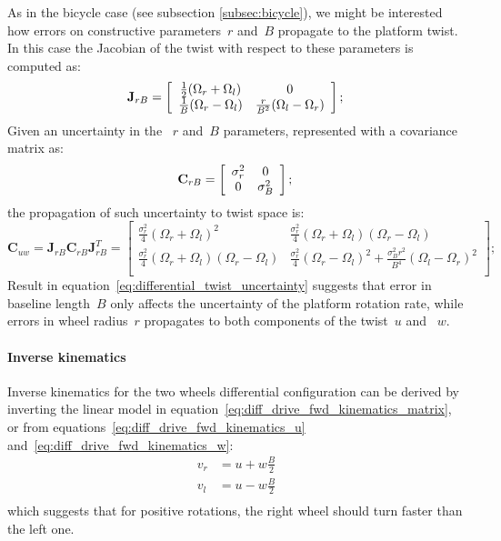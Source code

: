 As in the bicycle case (see subsection \ref{subsec:bicycle}), we might be interested how errors on constructive parameters~$r$ and~$B$ propagate to the platform twist. In this case the Jacobian of the twist with respect to these parameters is computed as: 
\begin{equation}
\mathbf{J}_{r B} = 
\left[
 \begin{array}{cc}
  \frac{1}{2}(\Omega_r+\Omega_l) & 0  \\
  \frac{1}{B}(\Omega_r-\Omega_l) & \frac{r}{B^2}(\Omega_l-\Omega_r)  \\
 \end{array}
 \right]; \\ 
\end{equation}
Given an uncertainty in the ~$r$ and~$B$ parameters, represented with a covariance matrix as:
\begin{equation}
\mathbf{C}_{r B} = 
\left[
 \begin{array}{cc}
  \sigma^2_r & 0  \\
  0 & \sigma^2_B  \\
 \end{array}
 \right]; \\ 
\end{equation}
the propagation of such uncertainty to twist space is: 
\begin{equation}
\mathbf{C}_{uw} = \mathbf{J}_{r B} \mathbf{C}_{r B} \mathbf{J}_{r B}^T = 
 \left[
 \begin{array}{cc}
 \frac{\sigma^2_r}{4}(\Omega_r+\Omega_l)^2 & \frac{\sigma^2_r}{4}(\Omega_r+\Omega_l)(\Omega_r-\Omega_l) \\
 \frac{\sigma^2_r}{4}(\Omega_r+\Omega_l)(\Omega_r-\Omega_l) & \frac{\sigma^2_r}{4}(\Omega_r-\Omega_l)^2 + \frac{\sigma^2_B r^2}{B^4}(\Omega_l-\Omega_r)^2 \\
 \end{array}
 \right];
 \label{eq:differential_twist_uncertainty}
\end{equation}
Result in equation~\ref{eq:differential_twist_uncertainty} suggests that error in baseline length~$B$ only affects the uncertainty of the platform rotation rate, while errors in wheel radius~$r$ propagates to both components of the twist~$u$ and ~$w$. 

\paragraph{Inverse kinematics}
Inverse kinematics for the two wheels differential configuration can be derived by inverting the linear model in equation~\ref{eq:diff_drive_fwd_kinematics_matrix}, or from equations~\ref{eq:diff_drive_fwd_kinematics_u} and~\ref{eq:diff_drive_fwd_kinematics_w}: 
\begin{align}
\label{eq:diff_drive_inv_kinematics}
 v_r & = u + w\frac{B}{2} \\
 v_l & = u - w\frac{B}{2} \\
\end{align}
which suggests that for positive rotations, the right wheel should turn faster than the left one.

